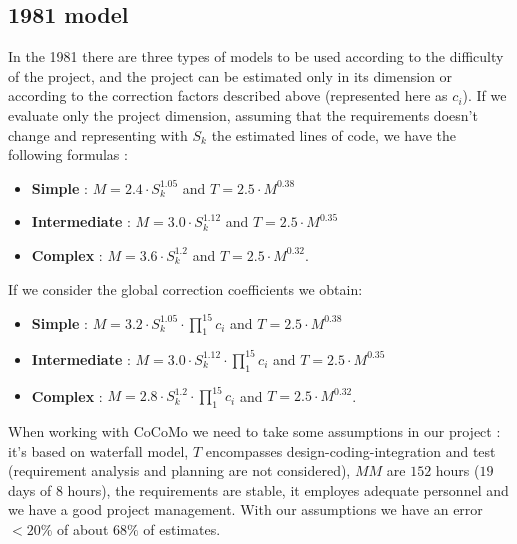 \subsection{1981 model}
In the 1981 there are three types of models to be used according to the difficulty of the project, and the project can be estimated only in its dimension or according to the correction factors described above (represented here as $c_i$). If we evaluate only the project dimension, assuming that the requirements doesn't change and representing with $S_k$ the estimated lines of code, we have the following formulas :
\begin{itemize}
    \item \textbf{Simple} : $M = 2.4 \cdot S_k^{1.05}$ and $T = 2.5 \cdot M^{0.38}$
    \item \textbf{Intermediate} : $M = 3.0 \cdot S_k^{1.12}$ and $T = 2.5 \cdot M^{0.35}$
    \item \textbf{Complex} : $M = 3.6 \cdot S_k^{1.2}$ and $T = 2.5 \cdot M^{0.32}$.
\end{itemize}
If we consider the global correction coefficients we obtain:
\begin{itemize}
    \item \textbf{Simple} : $M = 3.2 \cdot S_k^{1.05} \cdot \prod_{1}^{15} c_i$ and $T = 2.5 \cdot M^{0.38}$
    \item \textbf{Intermediate} : $M = 3.0 \cdot S_k^{1.12} \cdot \prod_{1}^{15} c_i$ and $T = 2.5 \cdot M^{0.35}$
    \item \textbf{Complex} : $M = 2.8 \cdot S_k^{1.2} \cdot \prod_{1}^{15} c_i$ and $T = 2.5 \cdot M ^{0.32}$.
\end{itemize}
When working with CoCoMo we need to take some assumptions in our project : it's based on waterfall model, $T$ encompasses design-coding-integration and test (requirement analysis and planning are not considered), $MM$ are $152$ hours ($19$ days of $8$ hours), the requirements are stable, it employes adequate personnel and we have a good project management. With our assumptions we have an error $< 20\%$ of about $68\%$ of estimates.

